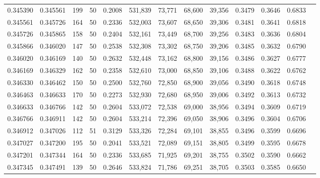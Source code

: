 \begin{tabular}{rrrrrrrrrrrrr}
0.345390 & 0.345561 &   199 &  50 &                                     0.2008 & 531,839 &  73,771 &  68,600 &  39,356 & 0.3479 & 0.3646 & 0.6833 \\
0.345561 & 0.345726 &   164 &  50 &                                     0.2336 & 532,003 &  73,607 &  68,650 &  39,306 & 0.3481 & 0.3641 & 0.6818 \\
0.345726 & 0.345865 &   158 &  50 &                                     0.2404 & 532,161 &  73,449 &  68,700 &  39,256 & 0.3483 & 0.3636 & 0.6804 \\
0.345866 & 0.346020 &   147 &  50 &                                     0.2538 & 532,308 &  73,302 &  68,750 &  39,206 & 0.3485 & 0.3632 & 0.6790 \\
0.346020 & 0.346169 &   140 &  50 &                                     0.2632 & 532,448 &  73,162 &  68,800 &  39,156 & 0.3486 & 0.3627 & 0.6777 \\
0.346169 & 0.346329 &   162 &  50 &                                     0.2358 & 532,610 &  73,000 &  68,850 &  39,106 & 0.3488 & 0.3622 & 0.6762 \\
0.346330 & 0.346462 &   150 &  50 &                                     0.2500 & 532,760 &  72,850 &  68,900 &  39,056 & 0.3490 & 0.3618 & 0.6748 \\
0.346463 & 0.346633 &   170 &  50 &                                     0.2273 & 532,930 &  72,680 &  68,950 &  39,006 & 0.3492 & 0.3613 & 0.6732 \\
0.346633 & 0.346766 &   142 &  50 &                                     0.2604 & 533,072 &  72,538 &  69,000 &  38,956 & 0.3494 & 0.3609 & 0.6719 \\
0.346766 & 0.346911 &   142 &  50 &                                     0.2604 & 533,214 &  72,396 &  69,050 &  38,906 & 0.3496 & 0.3604 & 0.6706 \\
0.346912 & 0.347026 &   112 &  51 &                                     0.3129 & 533,326 &  72,284 &  69,101 &  38,855 & 0.3496 & 0.3599 & 0.6696 \\
0.347027 & 0.347200 &   195 &  50 &                                     0.2041 & 533,521 &  72,089 &  69,151 &  38,805 & 0.3499 & 0.3595 & 0.6678 \\
0.347201 & 0.347344 &   164 &  50 &                                     0.2336 & 533,685 &  71,925 &  69,201 &  38,755 & 0.3502 & 0.3590 & 0.6662 \\
0.347345 & 0.347491 &   139 &  50 &                                     0.2646 & 533,824 &  71,786 &  69,251 &  38,705 & 0.3503 & 0.3585 & 0.6650 \\

\end{tabular}
